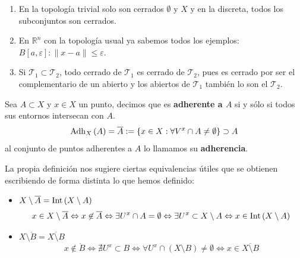 \begin{ej}
\begin{enumerate}
    \item En la topología trivial solo son cerrados $\emptyset$ y $X$ y en la discreta, todos los subconjuntos son cerrados.
    \item En $\mathbb{R}^n$ con la topología usual ya sabemos todos los ejemplos: $B\left[ a, \varepsilon \right] : \lVert x - a \rVert \le \varepsilon$.
    \item Si $\mathcal{T}_1 \subset \mathcal{T}_2$, todo cerrado de $\mathcal{T}_1$ es cerrado de $\mathcal{T}_2$, pues es cerrado por ser el complementario de un abierto y los abiertos de $\mathcal{T}_1$ también lo son el $\mathcal{T}_2$.
\end{enumerate}
\end{ej}

\begin{defi}[Adherencia]
Sea $A \subset X$ y $x\in X$ un punto, decimos que es \textbf{adherente a $A$} si y sólo si todos sus entornos intersecan con $A$.
$$
\operatorname{Adh}_X\left( A \right) = \overline{A} := \{x \in X: \forall V^x \cap A \neq \emptyset\} \supset A
$$
al conjunto de puntos adherentes a $A$ lo llamamos su \textbf{adherencia}.
\end{defi}

\begin{obs}
La propia definición nos sugiere ciertas equivalencias útiles que se obtienen escribiendo de forma distinta lo que hemos definido:
\begin{itemize}
\item $X \setminus \overline{A} = \operatorname{Int}\left( X \setminus A \right)$
$$
x \in X \setminus \overline{A} \Leftrightarrow x \not\in \overline{A} \Leftrightarrow \exists U^x \cap A = \emptyset \Leftrightarrow \exists U^x \subset X \setminus A \Leftrightarrow x \in \operatorname{Int}\left( X \setminus A \right)
$$
\item $X \setminus \mathring{B} = \overline{X \setminus B}$
$$
x \not\in \mathring{B} \Leftrightarrow \nexists U^x \subset B \Leftrightarrow \forall U^x \cap \left( X \setminus B \right) \neq \emptyset \Leftrightarrow x \in \overline{X \setminus B}
$$
\end{itemize}
\end{obs}


